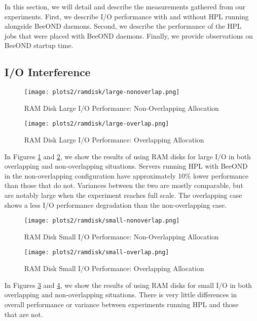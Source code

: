 \documentclass[conference]{IEEEtran}
\begin{document}
In this section, we will detail and describe the measurements gathered
from our experiments. First, we describe I/O performance with and
without HPL running alongside BeeOND daemons. Second, we describe the
performance of the HPL jobs that were placed with BeeOND
daemons. Finally, we provide observations on BeeOND startup time.

\subsection{I/O Interference}
\begin{figure}[!htb]
  \centerline{\texttt{[image: plots2/ramdisk/large-nonoverlap.png]}}
  \caption{RAM Disk Large I/O Performance: Non-Overlapping Allocation}
  \label{fig:ram-large-non}
\end{figure}

\begin{figure}[!htb]
  \centerline{\texttt{[image: plots2/ramdisk/large-overlap.png]}}
  \caption{RAM Disk Large I/O Performance: Overlapping Allocation}
  \label{fig:ram-large-over}
\end{figure}

In Figures \ref{fig:ram-large-non} and \ref{fig:ram-large-over},
we show the results of using RAM disks for large I/O in both
overlapping and non-overlapping situations. Servers running HPL with
BeeOND in the non-overlapping configuration have approximately 10\%
lower performance than those that do not. Variances between the two
are mostly comparable, but are notably large when the experiment
reaches full scale. The overlapping case shows a less I/O performance
degradation than the non-overlapping case.

\begin{figure}[!htb]
  \centerline{\texttt{[image: plots2/ramdisk/small-nonoverlap.png]}}
  \caption{RAM Disk Small I/O Performance: Non-Overlapping Allocation}
  \label{fig:ram-small-non}
\end{figure}

\begin{figure}[!htb]
  \centerline{\texttt{[image: plots2/ramdisk/small-overlap.png]}}
  \caption{RAM Disk Small I/O Performance: Overlapping Allocation}
  \label{fig:ram-small-over}
\end{figure}

In Figures \ref{fig:ram-small-non} and \ref{fig:ram-small-over},
we show the results of using RAM disks for small I/O in both
overlapping and non-overlapping situations. There is very little
differences in overall performance or variance between experiments
running HPL and those that are not.
\end{document}
